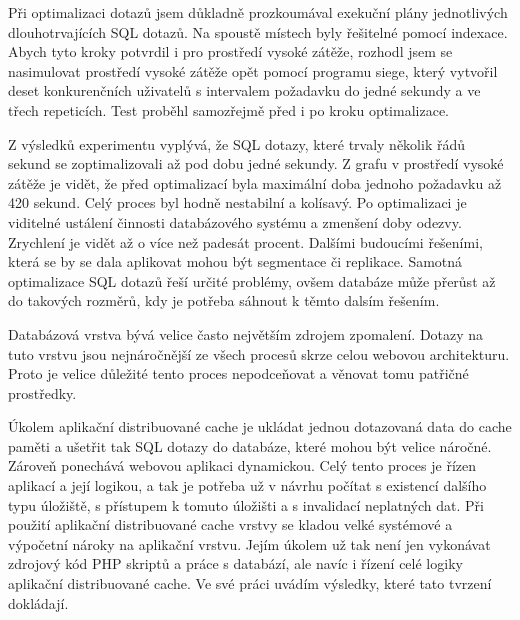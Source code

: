 \documentclass[12pt]{article}
\begin{document}
Při optimalizaci dotazů jsem důkladně prozkoumával exekuční plány jednotlivých dlouhotrvajících SQL dotazů. Na spoustě místech byly řešitelné pomocí indexace. Abych tyto kroky potvrdil i pro prostředí vysoké zátěže, rozhodl jsem se nasimulovat prostředí vysoké zátěže opět pomocí programu siege, který vytvořil deset konkurenčních uživatelů s intervalem požadavku do jedné sekundy a ve třech repeticích. Test proběhl samozřejmě před i po kroku optimalizace.

Z výsledků experimentu vyplývá, že SQL dotazy, které trvaly několik řádů sekund se zoptimalizovali až pod dobu jedné sekundy. Z grafu v prostředí vysoké zátěže je vidět, že před optimalizací byla maximální doba jednoho požadavku až 420 sekund. Celý proces byl hodně nestabilní a kolísavý. Po optimalizaci je viditelné ustálení činnosti databázového systému a zmenšení doby odezvy. Zrychlení je vidět až o více než padesát procent. Dalšími budoucími řešeními, která se by se dala aplikovat mohou být segmentace či replikace. Samotná optimalizace SQL dotazů řeší určité problémy, ovšem databáze může přerůst až do takových rozměrů, kdy je potřeba sáhnout k těmto dalsím řešením.

Databázová vrstva bývá velice často největším zdrojem zpomalení. Dotazy na tuto vrstvu jsou nejnáročnější ze všech procesů skrze celou webovou architekturu. Proto je velice důležité tento proces nepodceňovat a věnovat tomu patřičné prostředky.

\obrazek
{}

\obrazek
{}

\clearpage

\obrazek
{}


\obrazek
{}


\label{sec:memcached}
Úkolem aplikační distribuované cache je ukládat jednou dotazovaná data do cache paměti a ušetřit tak SQL dotazy do databáze, které mohou být velice náročné. Zároveň ponechává webovou aplikaci dynamickou. Celý tento proces je řízen aplikací a její logikou, a tak je potřeba už v návrhu počítat s existencí dalšího typu úložiště, s přístupem k tomuto úložišti a s invalidací neplatných dat. Při použití aplikační distribuované cache vrstvy se kladou velké systémové a výpočetní nároky na aplikační vrstvu. Jejím úkolem už tak není jen vykonávat zdrojový kód PHP skriptů a práce s databází, ale navíc i řízení celé logiky aplikační distribuované cache. Ve své práci uvádím výsledky, které tato tvrzení dokládají.
\end{document}
